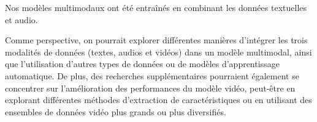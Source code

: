 \documentclass[a4paper]{article}
\begin{document}
Nos modèles multimodaux ont été entraînés en combinant les données textuelles et audio. 


Comme perspective, on pourrait explorer différentes manières d'intégrer les trois modalités de données (textes, audios et vidéos) dans un modèle multimodal, 
ainsi que l'utilisation d'autres types de données ou de modèles d'apprentissage automatique. 
De plus, des recherches supplémentaires pourraient également se concentrer sur l'amélioration des performances du modèle vidéo, 
peut-être en explorant différentes méthodes d'extraction de caractéristiques ou en utilisant des ensembles de données vidéo plus grands ou plus diversifiés.

\bigskip
\printbibliography
\end{document}
